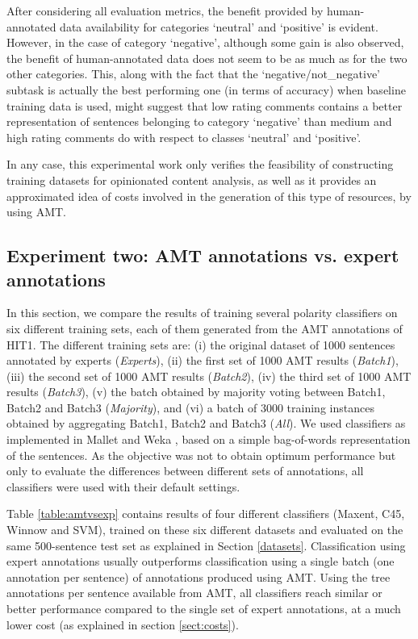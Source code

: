 \documentclass[11pt,letterpaper]{article}
\begin{document}
After considering all evaluation metrics, the benefit provided by human-annotated data 
availability for categories `neutral' and `positive' is evident. However, in the case of category `negative', although some 
gain is also observed, the benefit of human-annotated data does not seem to be as much as for the two other 
categories. This, along with the fact that the `negative/not\_negative' subtask is actually the best performing
one (in terms of accuracy) when baseline training data is used, might suggest that low rating comments contains 
a better representation of sentences belonging to category `negative' than medium and high rating comments do with
respect to classes `neutral' and `positive'. 

In any case, this experimental work only verifies the feasibility of constructing training datasets for
opinionated content analysis, as well as it provides an approximated idea of costs involved in the generation
of this type of resources, by using AMT.


\subsection{Experiment two: AMT annotations vs. expert annotations}
\label{eval2}

In this section, we compare the results of training several polarity classifiers on six different training sets, each of them generated from the AMT annotations of HIT1. The different training sets are: (i) the original dataset of 1000 sentences annotated by experts (\textit{Experts}), (ii) the first set of 1000 AMT results (\textit{Batch1}), (iii) the second set of 1000 AMT results (\textit{Batch2}), (iv) the third set of 1000 AMT results (\textit{Batch3}), (v) the batch obtained by majority voting between Batch1, Batch2 and Batch3 (\textit{Majority}), and (vi) a batch of 3000 training instances obtained by aggregating Batch1, Batch2 and Batch3 (\textit{All}).  We used classifiers as implemented in Mallet \cite{mccallum} and Weka \cite{weka}, based on a simple bag-of-words representation of the sentences.  As the objective was not to obtain optimum performance but only to evaluate the differences between different sets of annotations, all classifiers were used with their default settings.

Table \ref{table:amtvsexp} contains results of four different classifiers (Maxent, C45, Winnow and SVM), trained on these six different datasets and evaluated on the same 500-sentence test set as explained in Section \ref{datasets}.  Classification using expert annotations usually outperforms classification using a single batch (one annotation per sentence) of annotations produced using AMT.  Using the tree annotations per sentence available from AMT, all classifiers reach similar or better performance compared to the single set of expert annotations, at a much lower cost (as explained in section \ref{sect:costs}).
\end{document}
